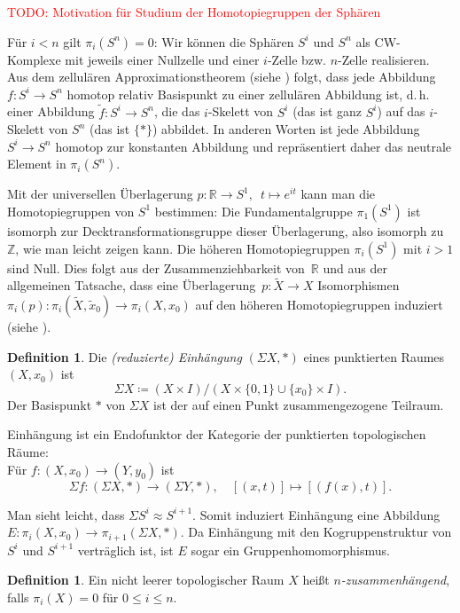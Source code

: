 \documentclass[11pt, a4paper, german]{article}
\theoremstyle{definition}
\newtheorem{defn}[lem]{Definition}
\theoremstyle{remark}
\newcommand{\TODO}[1]{\textcolor{red}{TODO: #1}} %
\newcommand{\R}{\mathbb{R}} %
\newcommand{\Z}{\mathbb{Z}} %
\newcommand{\homeo}{\approx} %
\renewcommand{\dh}{d.\,h.} %
\begin{document}
\TODO{Motivation für Studium der Homotopiegruppen der Sphären}

Für $i < n$ gilt $\pi_i(S^n) = 0$:
Wir können die Sphären $S^i$ und $S^n$ als CW-Komplexe mit jeweils einer Nullzelle und einer $i$-Zelle bzw. $n$-Zelle realisieren.
Aus dem zellulären Approximationstheorem (siehe \cite[\mbox{}Thm 4.8]{hatcher:at}) folgt, dass jede Abbildung $f : S^i \to S^n$ homotop relativ Basispunkt zu einer zellulären Abbildung ist, \dh{} einer Abbildung $\tilde{f} : S^i \to S^n$, die das $i$-Skelett von $S^i$ (das ist ganz $S^i$) auf das $i$-Skelett von $S^n$ (das ist $\{ * \}$) abbildet.
In anderen Worten ist jede Abbildung $S^i \to S^n$ homotop zur konstanten Abbildung und repräsentiert daher das neutrale Element in $\pi_i(S^n)$.

Mit der universellen Überlagerung $p : \R \to S^1, \enspace t \mapsto e^{it}$ kann man die Homotopiegruppen von $S^1$ bestimmen:
Die Fundamentalgruppe $\pi_1(S^1)$ ist isomorph zur Decktransformationsgruppe dieser Überlagerung, also isomorph zu~$\Z$, wie man leicht zeigen kann.
Die höheren Homotopiegruppen $\pi_i(S^1)$ mit $i > 1$ sind Null.
Dies folgt aus der Zusammenziehbarkeit von~$\R$ und aus der allgemeinen Tatsache, dass eine Überlagerung~$p : \widetilde{X} \to X$ Isomorphismen $\pi_i(p) : \pi_i(\widetilde{X}, \widetilde{x}_0) \to \pi_i(X, x_0)$ auf den höheren Homotopiegruppen induziert (siehe \cite[\mbox{}Prop 4.1]{hatcher:at}).

\begin{defn}
  Die \emph{(reduzierte) Einhängung} $(\Sigma X, *)$ eines punktierten Raumes $(X, x_0)$ ist
  \[ \Sigma X \coloneqq (X \times I) / (X \times \{ 0, 1 \} \cup \{ x_0 \} \times I). \]
  Der Basispunkt $*$ von $\Sigma X$ ist der auf einen Punkt zusammengezogene Teilraum.
\end{defn}

Einhängung ist ein Endofunktor der Kategorie der punktierten topologischen Räume: \\
Für $f : (X, x_0) \to (Y, y_0)$ ist
\[
  \Sigma f : (\Sigma X, *) \to (\Sigma Y, *), \quad
  [(x, t)] \mapsto [(f(x), t)].
\]

Man sieht leicht, dass $\Sigma S^i \homeo S^{i+1}$.
Somit induziert Einhängung eine Abbildung $E : \pi_i(X, x_0) \to \pi_{i+1}(\Sigma X, *)$.
Da Einhängung mit den Kogruppenstruktur von $S^i$ und $S^{i+1}$ verträglich ist, ist $E$ sogar ein Gruppenhomomorphismus.

\begin{defn}
  Ein nicht leerer topologischer Raum $X$ heißt \emph{$n$-zusammenhängend}, falls $\pi_i(X) = 0$ für $0 \leq i \leq n$.
\end{defn}
\end{document}
